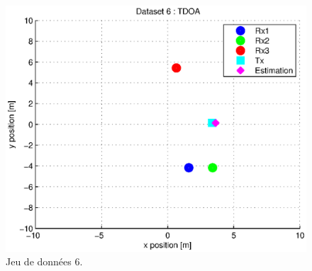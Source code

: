 \documentclass[10pt,a4paper]{article}
\begin{document}
\begin{figure}[h]
\centering
\includegraphics[scale = 0.5]{TDOA6}
\caption{Jeu de données 6.}
\label{ex3}
\end{figure}
\end{document}
